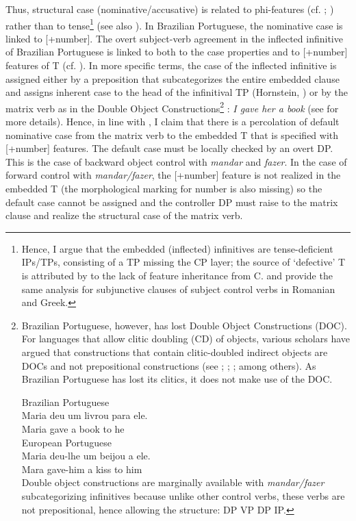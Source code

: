 \documentclass[output=paper]{langsci/langscibook}
\begin{document}
Thus, structural case (nominative\slash accusative) is related to phi-features (cf. \citealt{George1981}; \citealt{Sitaridou2006}) rather than to tense\footnote{Hence, I argue that the embedded (inflected) infinitives are tense-deficient IPs\slash TPs, consisting of a TP missing the CP layer; the source of ‘defective’ T is attributed by \citet{Chomsky2008} to the lack of feature inheritance from C. \citet{Alboiu2007} and \citet{Alexiadou2010} provide the same analysis for subjunctive clauses of subject control verbs in Romanian and Greek.} (see also \citealt{Pires2010}). In Brazilian Portuguese, the nominative case is linked to [+number]. The overt subject-verb agreement in the inflected infinitive of Brazilian Portuguese is linked to both to the case properties and to [+number] features of T (cf. \citealt{Nunes1998}). In more specific terms, the case of the inflected infinitive is assigned either by a preposition that subcategorizes the entire embedded clause and assigns inherent case to the head of the infinitival TP (Hornstein, \citet{Martins2008}) or by the matrix verb as in the Double Object Constructions\footnote{Brazilian Portuguese, however, has lost Double Object Constructions (DOC). For languages that allow clitic doubling (CD) of objects, various scholars have argued that constructions that contain clitic-doubled indirect objects are DOCs and not prepositional constructions (see \citealt{Demonte1995}; \citealt{Bleam1999}; \citealt{Anagnostopoulou2003}; among others). As Brazilian Portuguese has lost its clitics, it does not make use of the DOC. 

\ea Brazilian Portuguese\\
    \gll Maria deu   um livrou para ele.   \\
        Maria gave a     book  to      he\\
\z
\ea European Portuguese \\
    \gll Maria deu-lhe   um beijou a  ele. \\  
            Mara  gave-him a    kiss    to him\\
\z
Double object constructions are marginally available with \textit{mandar\slash fazer} subcategorizing infinitives because unlike other control verbs, these verbs are not prepositional, hence allowing the structure: DP VP DP IP.} : \textit{I gave her a book} (see \citealt{Larson1991} for more details). Hence, in line with \citet{Raposo1987}, I claim that there is a percolation of default nominative case from the matrix verb to the embedded T that is specified with [+number] features. The default case must be locally checked by an overt DP. This is the case of backward object control with \textit{mandar} and \textit{fazer}. In the case of forward control with \textit{mandar\slash fazer}, the [+number] feature is not realized in the embedded T (the morphological marking for number is also missing) so the default case cannot be assigned and the controller DP must raise to the matrix clause and realize the structural case of the matrix verb.
\end{document}
